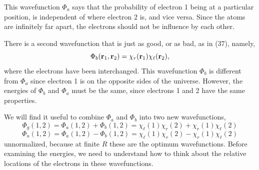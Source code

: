 This wavefunction $\Phi_a$ says that the probability of electron 1 being 
at a particular position, is independent of where electron 2 is, and vice 
versa. Since the atoms are infinitely far apart, the electrons should not be 
influence by each other.
    
There is a second wavefunction that is just as good, or as bad, as in 
(37), namely,
\begin{equation}
\Phi_b ( {\bf r}_1 , {\bf r}_2 ) = \chi_r ({\bf r}_1) \chi_\ell ( {\bf 
r}_2),
\end{equation}
where the electrons have been interchanged. This wavefunction $\Phi_b$ 
is different from $\Phi_a$ since electron 1 is on the opposite sides of 
the universe. However, the energies of $\Phi_b$ and $\Phi_a$ 
must be the same, since electrons 1 and 2 have the same properties.
    
We will find it useful to combine $\Phi_a$ and $\Phi_b$ into two new 
wavefunctions,
\begin{equation}
\Phi_g ( 1 , 2 ) = \Phi_a ( 1 , 2 ) + \Phi_b ( 1 , 2 ) = \chi_\ell ( 
1 ) \chi_r ( 2 ) + \chi_r ( 1 ) \chi_\ell ( 2 )
\label{eqno2-39a}
\end{equation}
\begin{equation}
\Phi_u ( 1 , 2 ) = \Phi_a ( 1 , 2 ) - \Phi_b ( 1 , 2 ) = \chi_\ell ( 
1 ) \chi_r ( 2 ) - \chi_r ( 1 ) \chi_\ell ( 2 )
\label{eqno2-39b}
\end{equation}
unnormalized, because at finite $R$ these are the optimum wavefunctions. 
Before examining the energies, we need to understand how to think about 
the relative locations of the electrons in these wavefunctions.
    

